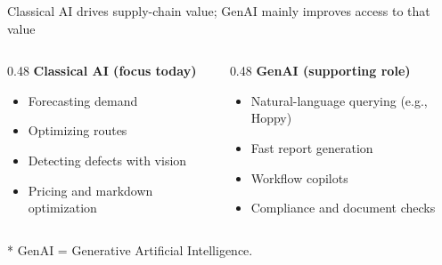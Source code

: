 \documentclass[aspectratio=169,10pt]{beamer}
\newcommand{\acronymnote}[1]{%
  \vfill
  {\raggedright\tiny\color{MutedGray}* #1\par}
}
\begin{document}
\begin{frame}{Classical AI drives supply-chain value; GenAI mainly improves access to that value}
  \begin{columns}[c,onlytextwidth]
    \begin{column}{0.48\textwidth}
      \textbf{Classical AI (focus today)}
      \footnotesize
      \begin{itemize}\setlength\itemsep{0.55em}
        \item Forecasting demand
        \item Optimizing routes
        \item Detecting defects with vision
        \item Pricing and markdown optimization
      \end{itemize}
    \end{column}
    \begin{column}{0.48\textwidth}
      \textbf{GenAI (supporting role)}
      \footnotesize
      \begin{itemize}\setlength\itemsep{0.55em}
        \item Natural-language querying (e.g., Hoppy)
        \item Fast report generation
        \item Workflow copilots
        \item Compliance and document checks
      \end{itemize}
    \end{column}
  \end{columns}
  \acronymnote{GenAI = Generative Artificial Intelligence.}
\end{frame}
\end{document}
